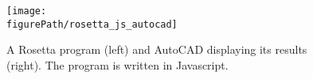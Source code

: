 \begin{figure}
	\centering
	\texttt{[image: \\figurePath/rosetta\_js\_autocad]}
	\caption{A Rosetta program (left) and AutoCAD displaying its results (right). The program is written in Javascript.}
	\label{fig:rosetta:ex}
\end{figure}


\begin{comment}

\subsubsection{Clara.io}
Clara.io\footnote{https://clara.io/ (last accessed on 10/10/2016)}\cite{houston2013clara} is a cloud application for 3D modeling and animation, similar to desktop software like Blender and 3ds Max.
Being in this category, Clara.io is more indicated for artistic work as opposed to technical work.
Nonetheless, it can be used in architecture projects to make architectural visualizations.


Apart from having features close to other 3D modeling software, being a cloud application Clara.io also supports cloud storage of scenes, real-time collaboration, and has integration with VRay cloud rendering.
Furthermore, Clara.io only requires a web browser compatible with HTML5 and WebGL, without any installation.
Like so, its users are free to switch between computers without having to configure anything and without having to move their work.

Clara.io's real-time collaboration lets users edit scenes simultaneously.
It gives users an environment where they can work together on tasks that, due to the limitations of files, would have to be performed in isolation to avoid edit conflicts.
For example, they can build a scene simultaneously, each one working on a part, but this time anyone sees the others changes immediately.

When it comes to programming, Clara.io has support for scripting and allows the creation of plug-ins to extend its functionality.%
\footnote{https://clara.io/learn/sdk (last accessed on 10/10/2016)}
It is possible to use Clara.io's scripting to do \gls{gd}, however, if a user wishes to do so, he needs to learn the scene's data model and how to use the scripting \gls{api} to manipulate it, which poses a considerable barrier when compared with existing \gls{gd} environments.

\end{comment}


